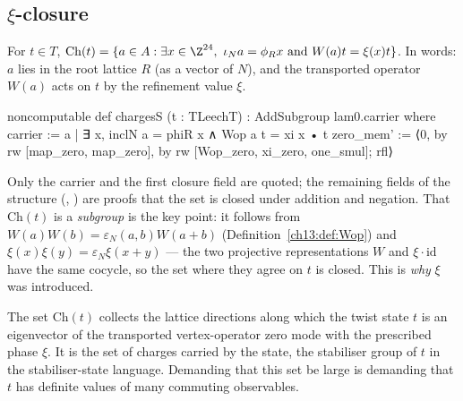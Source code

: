 \subsection{\texorpdfstring{$\xi$-closure}{xi-closure}}
\begin{definition}\label{ch13:def:chargesS}
For $t\in T$, $\mathrm{Ch}(t)=\{a\in A : \exists x\in\Z^{24},\ \iota_Na=\phi_Rx\ \text{and}\ W(a)t=\xi(x)t\}$. In words:
$a$ lies in the root lattice $R$ (as a vector of $N$), and the transported operator $W(a)$ acts on $t$ by the
refinement value $\xi$.
\end{definition}
\begin{leancode}
noncomputable def chargesS (t : TLeechT) : AddSubgroup lam0.carrier where
  carrier := {a | ∃ x, inclN a = phiR x ∧ Wop a t = xi x • t}
  zero_mem' := ⟨0, by rw [map_zero, map_zero], by rw [Wop_zero, xi_zero, one_smul]; rfl⟩
\end{leancode}
\begin{dictionary}
Only the carrier and the first closure field are quoted; the remaining fields of the structure
(, ) are proofs that the set is closed under addition and negation. That
$\mathrm{Ch}(t)$ is a \emph{subgroup} is the key point: it follows from $W(a)W(b)=\varepsilon_N(a,b)W(a+b)$
(Definition~\ref{ch13:def:Wop}) and $\xi(x)\xi(y)=\varepsilon_N\xi(x+y)$ --- the two projective representations $W$ and
$\xi\cdot\mathrm{id}$ have the same cocycle, so the set where they agree on $t$ is closed. This is
\emph{why} $\xi$ was introduced.
\end{dictionary}
\begin{physics}
The set $\mathrm{Ch}(t)$ collects the lattice directions along which the twist state $t$ is an eigenvector of the transported vertex-operator zero mode with the prescribed phase $\xi$. It is the set of charges carried by the state, the stabiliser group of $t$ in the stabiliser-state language. Demanding that this set be large is demanding that $t$ has definite values of many commuting observables.
\end{physics}

